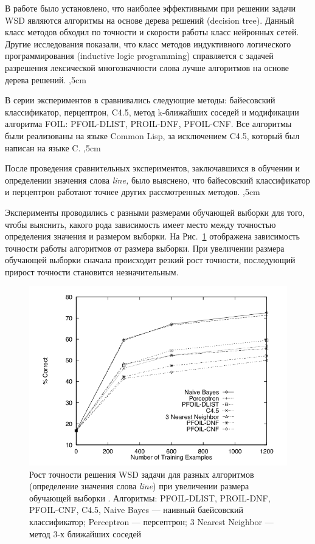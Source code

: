 \documentclass{article}
\begin{document}
\begin{articletext}
В работе \cite{Charles 1993} было установлено, что наиболее эффективными при решении задачи WSD являются алгоритмы на основе дерева решений (decision tree). Данный класс методов обходил по точности и скорости работы класс нейронных сетей. Другие исследования \cite{Mooney 1995} показали, что класс методов индуктивного логического программирования (inductive logic programming) справляется с задачей разрешения лексической многозначности слова лучше алгоритмов на основе дерева решений. 
,5cm

В серии экспериментов в \cite{Mooney 1996} сравнивались следующие методы: байесовский классификатор, перцептрон, C4.5, метод k-ближайших соседей и модификации алгоритма FOIL: PFOIL-DLIST, PROIL-DNF, PFOIL-CNF. Все алгоритмы были реализованы на языке Common Lisp, за исключением C4.5, который был написан на языке C.
,5cm

После проведения сравнительных экспериментов, заключавшихся в обучении и определении значения слова \textit{line,} было выяснено, что байесовский классификатор и перцептрон работают точнее других рассмотренных методов. 
,5cm

Эксперименты проводились с разными размерами обучающей выборки для того, чтобы выяснить, какого рода зависимость имеет место между точностью определения значения и размером выборки. На Рис.~\ref{kor1} отображена зависимость точности работы алгоритмов от размера выборки. При увеличении размера обучающей выборки сначала происходит резкий рост точности, последующий прирост точности становится незначительным.

\begin{figure}[H]
\includegraphics[keepaspectratio=true,
 width=0.9\columnwidth]{line_wsd_1_accuracy.png}
\caption{Рост точности решения WSD задачи для разных алгоритмов (определение значения слова \textit{line}) при увеличении размера обучающей выборки \cite{Mooney 1996}. Алгоритмы: PFOIL-DLIST, PROIL-DNF, PFOIL-CNF, C4.5, Naive Bayes --- наивный баейсовский классификатор; Perceptron --- персептрон; 3 Nearest Neighbor --- метод 3-х ближайших соседей}
\label{kor1}
\end{figure}


\end{articletext}
\end{document}
